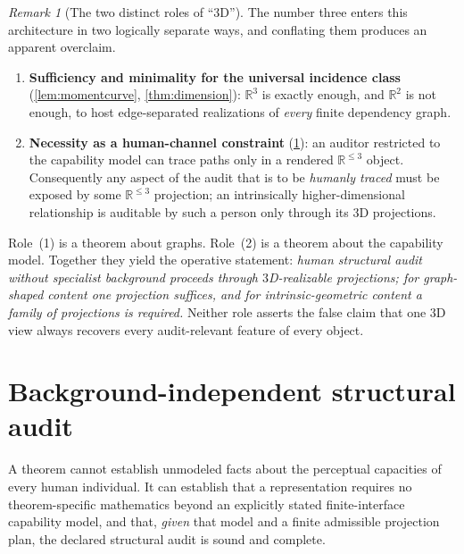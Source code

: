 \documentclass[11pt]{article}
\newcommand{\R}{\mathbb R}
\theoremstyle{plain}
\theoremstyle{definition}
\theoremstyle{remark}
\newtheorem{remark}[theorem]{Remark}
\begin{document}
\begin{remark}[The two distinct roles of ``3D'']
\label{rem:two-roles-3d}
The number three enters this architecture in two logically separate ways, and conflating them produces an apparent overclaim.
\begin{enumerate}
    \item \textbf{Sufficiency and minimality for the universal incidence class} (\cref{lem:momentcurve}, \cref{thm:dimension}): $\R^3$ is exactly enough, and $\R^2$ is not enough, to host edge-separated realizations of \emph{every} finite dependency graph.
    \item \textbf{Necessity as a human-channel constraint} (\cref{sec:human}): an auditor restricted to the capability model can trace paths only in a rendered $\R^{\le 3}$ object.  Consequently any aspect of the audit that is to be \emph{humanly traced} must be exposed by some $\R^{\le 3}$ projection; an intrinsically higher-dimensional relationship is auditable by such a person only through its $3$D projections.
\end{enumerate}
Role~(1) is a theorem about graphs.  Role~(2) is a theorem about the capability model.  Together they yield the operative statement: \emph{human structural audit without specialist background proceeds through $3$D-realizable projections; for graph-shaped content one projection suffices, and for intrinsic-geometric content a family of projections is required.}  Neither role asserts the false claim that one $3$D view always recovers every audit-relevant feature of every object.
\end{remark}

\section{Background-independent structural audit}
\label{sec:human}

A theorem cannot establish unmodeled facts about the perceptual capacities of
every human individual.  It can establish that a representation requires no
theorem-specific mathematics beyond an explicitly stated finite-interface
capability model, and that, \emph{given} that model and a finite admissible
projection plan, the declared structural audit is sound and complete.
\end{document}
